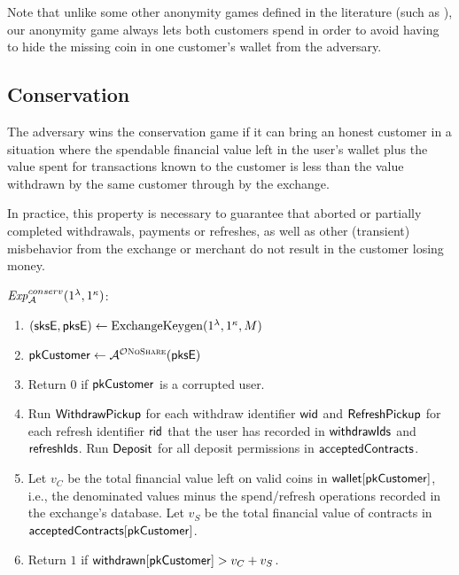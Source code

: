 Note that unlike some other anonymity games defined in the literature (such as
\cite{pointcheval2017cut}), our anonymity game always lets both customers spend
in order to avoid having to hide the missing coin in one customer's wallet
from the adversary.

\subsection{Conservation}
The adversary wins the conservation game if it can bring an honest customer in a
situation where the spendable financial value left in the user's wallet plus
the value spent for transactions known to the customer is less than the value
withdrawn by the same customer through by the exchange.

In practice, this property is necessary to guarantee that aborted or partially
completed withdrawals, payments or refreshes, as well as other (transient)
misbehavior from the exchange or merchant do not result in the customer losing
money.

\begin{mdframed}
\small
\noindent $\mathit{Exp}_{\cal A}^{conserv}(1^\lambda, 1^\kappa)$:
\vspace{-0.5\topsep}
\begin{enumerate}
  \setlength\itemsep{0em}
  \item $(\mathsf{sksE}, \mathsf{pksE}) \leftarrow \mathrm{ExchangeKeygen}(1^\lambda, 1^\kappa, M)$
  \item $\mathsf{pkCustomer} \leftarrow {\cal A}^{\mathcal{O}\textsc{NoShare}}(\mathsf{pksE})$
  \item Return $0$ if $\mathsf{pkCustomer}$ is a corrupted user.
  \item \label{game:conserv:run} Run $\mathsf{WithdrawPickup}$ for each withdraw identifier $\mathsf{wid}$
    and $\mathsf{RefreshPickup}$ for each refresh identifier $\mathsf{rid}$ that the user
    has recorded in $\mathsf{withdrawIds}$ and $\mathsf{refreshIds}$.  Run $\mathsf{Deposit}$
    for all deposit permissions in $\mathsf{acceptedContracts}$.
  \item Let $v_{C}$ be the total financial value left on valid coins in $\mathsf{wallet}[\mathsf{pkCustomer}]$,
    i.e., the denominated values minus the spend/refresh operations recorded in the exchange's database.
    Let $v_{S}$ be the total financial value of contracts in $\mathsf{acceptedContracts}[\mathsf{pkCustomer}]$.
  \item Return $1$ if $\mathsf{withdrawn}[\mathsf{pkCustomer}] > v_{C} + v_{S}$.
\end{enumerate}
\end{mdframed}


